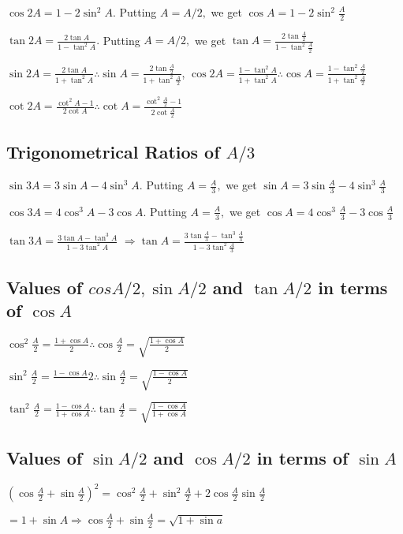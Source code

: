 \noindent $\cos 2A = 1 - 2\sin^2A.$ Putting $A = A/2,$ we get $\cos A = 1 - 2\sin^2\frac{A}{2}$

\noindent $\tan 2A = \frac{2\tan A}{1 - \tan^2A}.$ Putting $A = A/2,$ we get $\tan A = \frac{2\tan \frac{A}{2}}{1 - \tan^2\frac{A}{2}}$

\noindent $\sin 2A = \frac{2\tan A}{1 + \tan^2A} \therefore \sin A = \frac{2\tan \frac{A}{2}}{1 + \tan^2\frac{A}{2}}$, $\cos 2A = \frac{1 - \tan^2A}{1 + \tan^2A} \therefore \cos A = \frac{1 - \tan^2\frac{A}{2}}{1 + \tan^2\frac{A}{2}}$

\noindent $\cot 2A = \frac{\cot^2A - 1}{2\cot A} \therefore \cot A = \frac{\cot^2\frac{A}{2} - 1}{2\cot \frac{A}{2}}$

\subsection{Trigonometrical Ratios of $A/3$}
$\sin 3A = 3\sin A - 4\sin^3A.$ Putting $A = \frac{A}{3},$ we get $\sin A = 3\sin \frac{A}{3} - 4\sin^3\frac{A}{3}$

\noindent $\cos 3A = 4\cos^3A - 3\cos A$. Putting $A = \frac{A}{3},$ we get $\cos A = 4\cos^3\frac{A}{3} - 3\cos \frac{A}{3}$

$\tan 3A = \frac{3\tan A - \tan^3A}{1 - 3\tan^2A}$ $\Rightarrow \tan A = \frac{3\tan\frac{A}{3} - \tan^3\frac{A}{3}}{1 - 3\tan^2\frac{A}{3}}$

\subsection{Values of $cos A/2, \sin A/2$ and $\tan A/2$ in terms of $\cos A$}
$\cos^2\frac{A}{2} = \frac{1 + \cos A}{2} \therefore \cos \frac{A}{2} = \sqrt{\frac{1 + \cos A}{2}}$

\noindent $\sin^2\frac{A}{2} = \frac{1 - \cos A}{}2 \therefore \sin \frac{A}{2} = \sqrt{\frac{1 - \cos A}{2}}$

\noindent $\tan^2\frac{A}{2} = \frac{1 - \cos A}{1 + \cos A} \therefore \tan\frac{A}{2} = \sqrt{\frac{1 - \cos A}{1 + \cos A}}$

\subsection{Values of $\sin A/2$ and $\cos A/2$ in terms of $\sin A$}
$\left(\cos \frac{A}{2} + \sin\frac{A}{2}\right)^2 = \cos^2\frac{A}{2} + \sin^2\frac{A}{2} + 2\cos\frac{A}{2}\sin\frac{A}{2}$

\noindent $= 1 + \sin A \Rightarrow \cos \frac{A}{2} + \sin \frac{A}{2} = \sqrt{1 + \sin a}$

